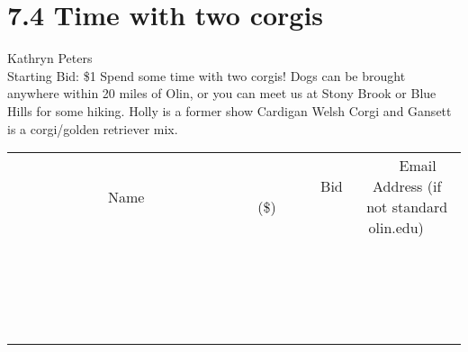 \documentclass[11pt]{article}
\begin{document}
\section*{7.4 Time with two corgis}
Kathryn Peters
\\
Starting Bid: \$1
\newline
Spend some time with two corgis! Dogs can be brought anywhere within 20 miles of Olin, or you can meet us at Stony Brook or Blue Hills for some hiking. Holly is a former show Cardigan Welsh Corgi and Gansett is a corgi/golden retriever mix.
\\[3ex]
\begin{tabular}{c c c}
~~~~~~~~~~~~~Name~~~~~~~~~~~~~ & ~~~~~~~~~Bid (\$)~~~~~~~~~  & ~~~Email Address (if not standard olin.edu)~~~\\
 & & \\
\hline
 & & \\
\hline
 & & \\
\hline
 & & \\
\hline
 & & \\
\hline
 & & \\
\hline
 & & \\
\hline
 & & \\
\hline
 & & \\
\hline
 & & \\
\hline
 & & \\
\hline
 & & \\
\hline
 & & \\
\hline
 & & \\
\hline
 & & \\
\hline
 & & \\
\hline
 & & \\
\hline
 & & \\
\hline
 & & \\
\hline
\end{tabular}
\newpage
\end{document}
